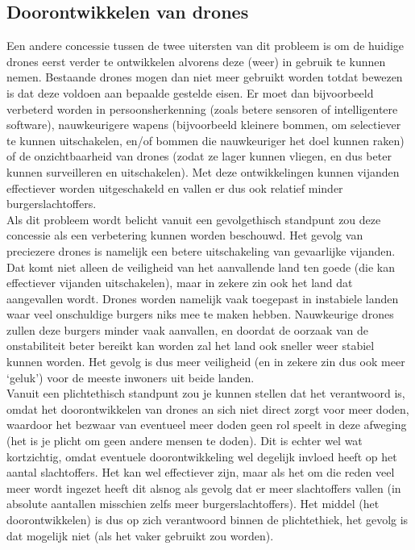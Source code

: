 \subsection{Doorontwikkelen van drones}\label{chapter:doorontwikkelen}
\subtitle{Tim Hosman}
Een andere concessie tussen de twee uitersten van dit probleem is om de huidige drones eerst verder te ontwikkelen alvorens deze (weer) in gebruik te kunnen nemen. Bestaande drones mogen dan niet meer gebruikt worden totdat bewezen is dat deze voldoen aan bepaalde gestelde eisen. Er moet dan bijvoorbeeld verbeterd worden in persoonsherkenning (zoals betere sensoren of intelligentere software), nauwkeurigere wapens (bijvoorbeeld kleinere bommen, om selectiever te kunnen uitschakelen, en/of bommen die nauwkeuriger het doel kunnen raken) of de onzichtbaarheid van drones (zodat ze lager kunnen vliegen, en dus beter kunnen surveilleren en uitschakelen). Met deze ontwikkelingen kunnen vijanden effectiever worden uitgeschakeld en vallen er dus ook relatief minder burgerslachtoffers.\\

Als dit probleem wordt belicht vanuit een gevolgethisch standpunt zou deze concessie als een verbetering kunnen worden beschouwd. Het gevolg van preciezere drones is namelijk een betere uitschakeling van gevaarlijke vijanden. Dat komt niet alleen de veiligheid van het aanvallende land ten goede (die kan effectiever vijanden uitschakelen), maar in zekere zin ook het land dat aangevallen wordt. Drones worden namelijk vaak toegepast in instabiele landen waar veel onschuldige burgers niks mee te maken hebben. Nauwkeurige drones zullen deze burgers minder vaak aanvallen, en doordat de oorzaak van de onstabiliteit beter bereikt kan worden zal het land ook sneller weer stabiel kunnen worden. Het gevolg is dus meer veiligheid (en in zekere zin dus ook meer `geluk') voor de meeste inwoners uit beide landen.\\

Vanuit een plichtethisch standpunt zou je kunnen stellen dat het verantwoord is, omdat het doorontwikkelen van drones an sich niet direct zorgt voor meer doden, waardoor het bezwaar van eventueel meer doden geen rol speelt in deze afweging (het is je plicht om geen andere mensen te doden). Dit is echter wel wat kortzichtig, omdat eventuele doorontwikkeling wel degelijk invloed heeft op het aantal slachtoffers. Het kan wel effectiever zijn, maar als het om die reden veel meer wordt ingezet heeft dit alsnog als gevolg dat er meer slachtoffers vallen (in absolute aantallen misschien zelfs meer burgerslachtoffers). Het middel (het doorontwikkelen) is dus op zich verantwoord binnen de plichtethiek, het gevolg is dat mogelijk niet (als het vaker gebruikt zou worden).\\

